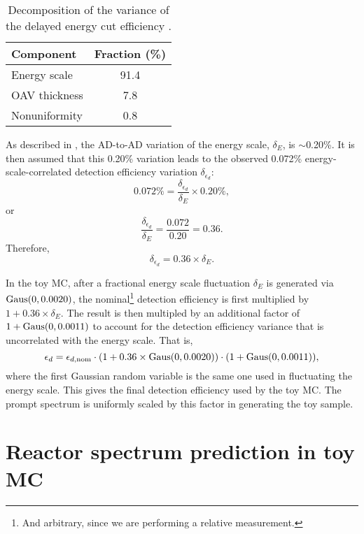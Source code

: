 \documentclass[../thesis.tex]{subfiles}
\begin{document}
\begin{table}[ht]
  \begin{tabular}{lc}
    \toprule
    Component & Fraction (\%) \\
    \midrule
    Energy scale & 91.4 \\
    OAV thickness & 7.8 \\
    Nonuniformity & 0.8 \\
    \bottomrule
  \end{tabular}
  \caption{Decomposition of the variance of the delayed energy cut efficiency \cite{loganDetEff}.}
  \label{tab:delayedEffVariance}
\end{table}

As described in \cite[Sec.\@ III B 5 b]{An_2017}, the AD-to-AD variation of the energy scale, $\delta_E$, is $\sim$0.20\%. It is then assumed that this 0.20\% variation leads to the observed 0.072\% energy-scale-correlated detection efficiency variation $\delta_{\epsilon_d}$:
\begin{equation}
  0.072\% = \frac{\delta_{\epsilon_d}}{\delta_E} \times 0.20\%,
\end{equation}
or
\begin{equation}
  \frac{\delta_{\epsilon_d}}{\delta_E} = \frac{0.072}{0.20} = 0.36.
\end{equation}
Therefore,
\begin{equation}
  \delta_{\epsilon_d} = 0.36 \times \delta_E.
\end{equation}

In the toy MC, after a fractional energy scale fluctuation $\delta_E$ is generated via $\operatorname{Gaus}(0, 0.0020)$, the nominal\footnote{And arbitrary, since we are performing a relative measurement.} detection efficiency is first multiplied by $1 + 0.36 \times \delta_E$. The result is then multipled by an additional factor of $1 + \operatorname{Gaus}(0, 0.0011)$ to account for the detection efficiency variance that is uncorrelated with the energy scale. That is,
\begin{equation}
  \epsilon_d = \epsilon_{d,\mathrm{nom}} \cdot (1 + 0.36 \times \operatorname{Gaus}(0, 0.0020)) \cdot (1 + \operatorname{Gaus}(0, 0.0011)),
\end{equation}
where the first Gaussian random variable is the same one used in fluctuating the energy scale. This gives the final detection efficiency used by the toy MC. The prompt spectrum is uniformly scaled by this factor in generating the toy sample.

\section{Reactor spectrum prediction in toy MC}
\label{sec:reactoy}
\end{document}
